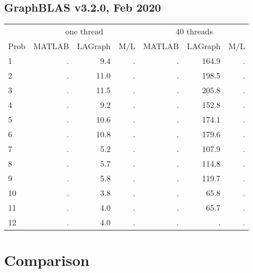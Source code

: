 \documentclass[12pt]{article}
\begin{document}
\subsection{GraphBLAS v3.2.0, Feb 2020}

{\small
\begin{tabular}{l|rr|r||rr|r}
\hline
     & \multicolumn{3}{c}{one thread}                &  \multicolumn{3}{c}{40 threads}  \\
Prob & MATLAB         & LAGraph        & M/L         &   MATLAB      & LAGraph       & M/L        \\
\hline
  1  &{           .  }& {         9.4 }&        .    &  {        .  }& {      164.9 }&      .     \\
  2  &{           .  }& {        11.0 }&        .    &  {        .  }& {      198.5 }&      .     \\
  3  &{           .  }& {        11.5 }&        .    &  {        .  }& {      205.8 }&      .     \\
\hline
  4  &{           .  }& {         9.2 }&        .    &  {        .  }& {      152.8 }&      .     \\
  5  &{           .  }& {        10.6 }&        .    &  {        .  }& {      174.1 }&      .     \\
  6  &{           .  }& {        10.8 }&        .    &  {        .  }& {      179.6 }&      .     \\
\hline
  7  &{           .  }& {         5.2 }&        .    &  {        .  }& {      107.9 }&      .     \\
  8  &{           .  }& {         5.7 }&        .    &  {        .  }& {      114.8 }&      .     \\
  9  &{           .  }& {         5.8 }&        .    &  {        .  }& {      119.7 }&      .     \\
\hline
 10  &{           .  }& {         3.8 }&        .    &  {        .  }& {       65.8 }&      .     \\
 11  &{           .  }& {         4.0 }&        .    &  {        .  }& {       65.7 }&      .     \\
 12  &{           .  }& {         4.0 }&        .    &  {        .  }& {         .  }&      .     \\
\end{tabular}
}

\section{Comparison}
\end{document}
